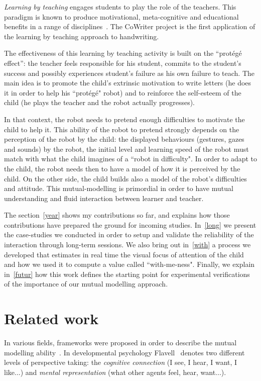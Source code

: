 \documentclass[10pt,a4paper]{article}
\begin{document}
\emph{Learning by teaching} engages students to play the role of the teachers. 
This  paradigm is known to produce motivational, meta-cognitive and educational benefits in a range of disciplines~\cite{Rohrbeck2003}. 
The CoWriter project is the first application of the learning by teaching approach to handwriting.

The effectiveness of this learning by teaching activity is built on the ``prot\'eg\'e effect'': the teacher feels responsible for his student, commits to the student's success and possibly experiences student's failure as his own failure to teach. 
The main idea is to promote the child's extrinsic motivation to write letters (he does it in order to help his ``prot\'eg\'e" robot) and to reinforce the self-esteem of the child (he plays the teacher and the robot actually progresses).

In that context, the robot needs to pretend enough difficulties to motivate the child to help it. 
This ability of the robot to pretend strongly depends on the perception of the robot by the child: the displayed behaviours (gestures, gazes and sounds) by the robot, the initial level and learning speed of the robot must match with what the child imagines of a ``robot in difficulty".
In order to adapt to the child, the robot needs then to have a model of how it is perceived by the child. On the other side, the child builds also a model of the robot's difficulties and attitude. 
This mutual-modelling is primordial in order to have mutual understanding and fluid interaction between learner and teacher. 

The section~\ref{year} shows my contributions so far, and explains how those contributions have prepared the ground for incoming studies. In~\ref{long} we present the case-studies we conducted in order to setup and validate the reliability of the interaction through long-term sessions. We also bring out in~\ref{with} a process we developed that estimates in real time the visual focus of attention of the child and how we used it to compute a value called ``with-me-ness". 
Finally, we explain in~\ref{futur} how this work defines the starting point for experimental verifications of the importance of our mutual modelling approach.
\section{Related work}\label{rw}


In various fields, frameworks were proposed in order to describe the mutual modelling ability~\cite{lemaignan2015mutual}. 
In developmental psychology Flavell~\cite{flavell1990developmental} denotes two different levels of perspective taking: the \textit{cognitive connection} (I see, I hear, I want, I like...) and \textit{mental representation} (what other agents feel, hear, want...).
\end{document}
